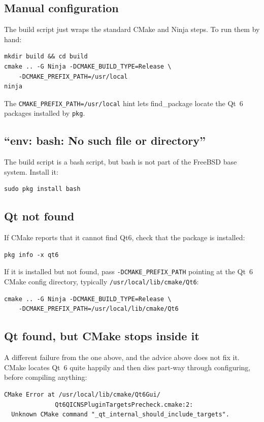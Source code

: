 \documentclass[11pt]{article}
\begin{document}
\subsection{Manual configuration}

The build script just wraps the standard CMake and Ninja steps.  To run them
by hand:
\begin{lstlisting}
mkdir build && cd build
cmake .. -G Ninja -DCMAKE_BUILD_TYPE=Release \
    -DCMAKE_PREFIX_PATH=/usr/local
ninja
\end{lstlisting}
The \texttt{CMAKE\_PREFIX\_PATH=/usr/local} hint lets find\_package locate the
Qt~6 packages installed by \texttt{pkg}.

\subsection{``env: bash: No such file or directory''}

The build script is a bash script, but bash is not part of the FreeBSD base
system.  Install it:
\begin{lstlisting}
sudo pkg install bash
\end{lstlisting}

\subsection{Qt not found}

If CMake reports that it cannot find Qt6, check that the package is installed:
\begin{lstlisting}
pkg info -x qt6
\end{lstlisting}
If it is installed but not found, pass \texttt{-DCMAKE\_PREFIX\_PATH} pointing
at the Qt~6 CMake config directory, typically
\texttt{/usr/local/lib/cmake/Qt6}:
\begin{lstlisting}
cmake .. -G Ninja -DCMAKE_BUILD_TYPE=Release \
    -DCMAKE_PREFIX_PATH=/usr/local/lib/cmake/Qt6
\end{lstlisting}

\subsection{Qt found, but CMake stops inside it}

A different failure from the one above, and the advice above does not fix
it.  CMake locates Qt~6 quite happily and then dies part-way through
configuring, before compiling anything:
\begin{lstlisting}
CMake Error at /usr/local/lib/cmake/Qt6Gui/
              Qt6QICNSPluginTargetsPrecheck.cmake:2:
  Unknown CMake command "_qt_internal_should_include_targets".
\end{lstlisting}
\end{document}
